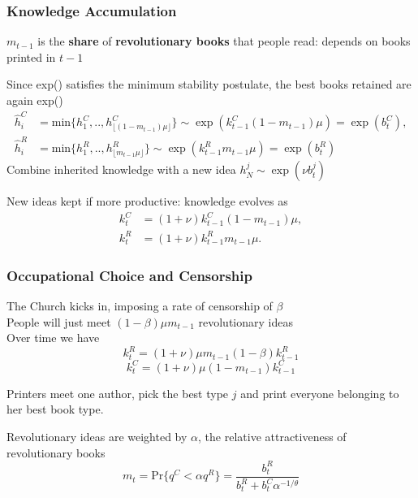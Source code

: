 \documentclass[aspectratio=169,red,12pt]{beamer}
\begin{document}
\begin{frame}
	\frametitle{Knowledge Accumulation}
	$m_{t-1}$ is the \textbf{share} of \textbf{revolutionary books} that people read: depends on books printed in $t-1$\vspace{0.2cm}
	
	Since exp() satisfies the minimum stability postulate, the best books retained are again exp()
	\begin{align*}	
	\hat{h}^C_i&=\text{min}\{h^C_1,..,h^C_{\lfloor(1-m_{t-1}) \mu\rfloor}\}\sim \exp(k^C_{t-1} (1-m_{t-1})\mu)=\exp(b_t^C),
	\\ \hat{h}^R_i&=\text{min}\{h^R_1,..,h^R_{\lfloor m_{t-1} \mu \rfloor}\} \sim \exp(k^R_{t-1} m_{t-1} \mu)=\exp(b_t^R)
	\end{align*}
	Combine inherited knowledge with a new idea $h^j_N\sim  \exp(\nu b^j_t)$\vspace{0.2cm}
	
	New ideas kept if more productive: knowledge evolves as
	\begin{align*}
	k_{t}^C&=(1+\nu) k_{t-1}^C (1-m_{t-1}) \mu,\\
	k_{t}^R&=(1+\nu) k_{t-1}^R m_{t-1}\mu.
	\end{align*}
	
\end{frame}

\begin{frame}
	\frametitle{Occupational Choice and Censorship}
	The Church kicks in, imposing a rate of censorship of $\beta$\\ \vspace{0.2cm}
	People will just meet $(1-\beta)\mu m_{t-1} $ revolutionary ideas\\ \vspace{0.2cm}
	Over time we have
	\[k^R_{t}=(1+\nu)\mu m_{t-1} (1-\beta) k^R_{t-1}\]
	\[k^C_{t}=(1+\nu)\mu (1-m_{t-1}) k^C_{t-1}\]
	
	Printers meet one author, pick the best type $j$ and print everyone belonging to her best book type. \vspace{0.2cm}
	
	Revolutionary ideas are weighted by $\alpha$, the relative attractiveness of revolutionary books
	\[m_t=\text{Pr}\{q^C<\alpha q^R\}=\frac{b^R_t}{b^R_t+b^C_t \alpha^{-1/\theta}}\]
\end{frame}
\end{document}
